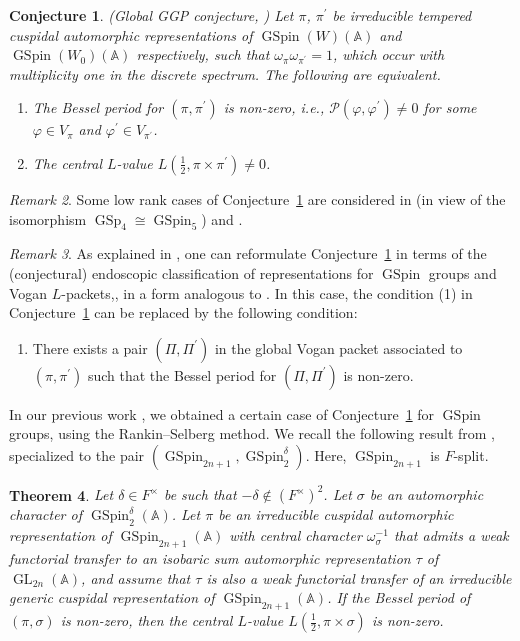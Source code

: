 \documentclass[12pt]{amsart}
\newcommand{\A}{\mathbb{A}}
\newtheorem{theorem}{Theorem}[section]
\newtheorem{conjecture}[theorem]{Conjecture}%
\theoremstyle{remark}
\newtheorem{remark}[theorem]{Remark}%
\DeclareMathOperator{\GL}{GL}
\DeclareMathOperator{\GSpin}{GSpin}
\DeclareMathOperator{\GSp}{GSp}
\begin{document}
\begin{conjecture}(Global GGP conjecture, \cite{GanGrossPrasad2012})
\label{GGP-Conjecture}
Let $\pi$, $\pi^\prime$ be irreducible tempered cuspidal automorphic representations of $\GSpin(W)(\A)$ and $\GSpin(W_0)(\A)$ respectively, such that $\omega_{\pi}\omega_{\pi^\prime}=1$, which occur with multiplicity one in the discrete spectrum. The following are equivalent.
\begin{enumerate}
\item The Bessel period for $(\pi, \pi^\prime)$ is non-zero, i.e.,  $\mathcal{P}(\varphi, \varphi^\prime)\not=0$ for some $\varphi\in V_\pi$ and $\varphi^\prime\in V_{\pi^\prime}$.
\item The central $L$-value $L(\frac{1}{2}, \pi\times \pi^\prime)\not=0$.
\end{enumerate}
\end{conjecture}

\begin{remark}
Some low rank cases of Conjecture~\ref{GGP-Conjecture} are considered in \cite{PrasadTakloo-Bighash2011} (in view of the isomorphism $\GSp_4\cong \GSpin_5$) and \cite{Emory2020}.
\end{remark}

\begin{remark}
As explained in \cite[\S 26]{GanGrossPrasad2012}, one can reformulate Conjecture~\ref{GGP-Conjecture} in terms of the (conjectural) endoscopic classification of representations for $\GSpin$ groups and Vogan $L$-packets,, in a form analogous to \cite[Conjecture 26.1]{GanGrossPrasad2012}. In this case, the condition (1) in Conjecture~\ref{GGP-Conjecture} can be replaced by the following condition:
\begin{enumerate}
\item[(1')] There exists a pair $(\Pi, \Pi^\prime)$ in the global Vogan packet associated to $(\pi, \pi^\prime)$ such that the Bessel period for $(\Pi, \Pi^\prime)$ is non-zero.
\end{enumerate}
\end{remark}

In our previous work \cite{Yan2025GGP}, we obtained a certain case of Conjecture~\ref{GGP-Conjecture} for $\GSpin$ groups, using the Rankin--Selberg method. We recall the following result from \cite{Yan2025GGP}, specialized to the pair $(\GSpin_{2n+1}, \GSpin_2^\delta)$. Here, $\GSpin_{2n+1}$ is $F$-split.

\begin{theorem}\cite{Yan2025GGP}
\label{Intro-thm-GGP-forward}
Let $\delta\in F^\times$ be such that $-\delta\not\in (F^\times)^2$. 
Let $\sigma$ be an automorphic character of $\GSpin_2^{\delta}(\A)$.
Let $\pi$ be an irreducible cuspidal automorphic representation of $\GSpin_{2n+1}(\A)$ with central character $\omega_{\sigma}^{-1}$ that admits a weak functorial transfer to an isobaric sum automorphic representation $\tau$ of $\GL_{2n}(\A)$, and assume that $\tau$ is also a weak functorial transfer of an irreducible generic cuspidal representation of $\GSpin_{2n+1}(\A)$. If the Bessel period of $(\pi, \sigma)$ is non-zero, then the central $L$-value $L(\frac{1}{2}, \pi\times\sigma)$ is non-zero.
\end{theorem}
\end{document}
